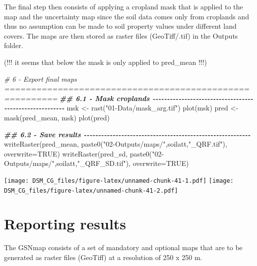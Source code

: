 \documentclass[
  10pt,
  b5paper,
  oneside]{book}
\newenvironment{Shaded}{\begin{snugshade}}{\end{snugshade}}
\newcommand{\AttributeTok}[1]{\textcolor[rgb]{0.77,0.63,0.00}{#1}}
\newcommand{\CommentTok}[1]{\textcolor[rgb]{0.56,0.35,0.01}{\textit{#1}}}
\newcommand{\ConstantTok}[1]{\textcolor[rgb]{0.00,0.00,0.00}{#1}}
\newcommand{\DocumentationTok}[1]{\textcolor[rgb]{0.56,0.35,0.01}{\textbf{\textit{#1}}}}
\newcommand{\FunctionTok}[1]{\textcolor[rgb]{0.00,0.00,0.00}{#1}}
\newcommand{\NormalTok}[1]{#1}
\newcommand{\OtherTok}[1]{\textcolor[rgb]{0.56,0.35,0.01}{#1}}
\newcommand{\StringTok}[1]{\textcolor[rgb]{0.31,0.60,0.02}{#1}}
\begin{document}
The final step then consists of applying a cropland mask that is applied to the map and the uncertainty map since the soil data comes only from croplands and thus no assumption can be made to soil property values under different land covers. The maps are then stored as raster files (GeoTiff/.tif) in the Outputs folder.

(!!! it seems that below the mask is only applied to pred\_mean !!!)

\begin{Shaded}
\begin{Highlighting}[]
\CommentTok{\# 6 {-} Export final maps ========================================================}
\DocumentationTok{\#\# 6.1 {-} Mask croplands {-}{-}{-}{-}{-}{-}{-}{-}{-}{-}{-}{-}{-}{-}{-}{-}{-}{-}{-}{-}{-}{-}{-}{-}{-}{-}{-}{-}{-}{-}{-}{-}{-}{-}{-}{-}{-}{-}{-}{-}{-}{-}{-}{-}{-}{-}{-}{-}{-}{-}{-}{-}{-}{-}{-}{-}}
\NormalTok{msk }\OtherTok{\textless{}{-}} \FunctionTok{rast}\NormalTok{(}\StringTok{"01{-}Data/mask\_arg.tif"}\NormalTok{)}
\FunctionTok{plot}\NormalTok{(msk)}
\NormalTok{pred }\OtherTok{\textless{}{-}} \FunctionTok{mask}\NormalTok{(pred\_mean, msk)}
\FunctionTok{plot}\NormalTok{(pred)}

\DocumentationTok{\#\# 6.2 {-} Save results {-}{-}{-}{-}{-}{-}{-}{-}{-}{-}{-}{-}{-}{-}{-}{-}{-}{-}{-}{-}{-}{-}{-}{-}{-}{-}{-}{-}{-}{-}{-}{-}{-}{-}{-}{-}{-}{-}{-}{-}{-}{-}{-}{-}{-}{-}{-}{-}{-}{-}{-}{-}{-}{-}{-}{-}{-}{-}}
\FunctionTok{writeRaster}\NormalTok{(pred\_mean, }
            \FunctionTok{paste0}\NormalTok{(}\StringTok{"02{-}Outputs/maps/"}\NormalTok{,soilatt,}\StringTok{"\_QRF.tif"}\NormalTok{),}
            \AttributeTok{overwrite=}\ConstantTok{TRUE}\NormalTok{)}
\FunctionTok{writeRaster}\NormalTok{(pred\_sd, }
            \FunctionTok{paste0}\NormalTok{(}\StringTok{"02{-}Outputs/maps/"}\NormalTok{,soilatt,}\StringTok{"\_QRF\_SD.tif"}\NormalTok{),}
            \AttributeTok{overwrite=}\ConstantTok{TRUE}\NormalTok{)}
\end{Highlighting}
\end{Shaded}

\texttt{[image: DSM\_CG\_files/figure-latex/unnamed-chunk-41-1.pdf]} \texttt{[image: DSM\_CG\_files/figure-latex/unnamed-chunk-41-2.pdf]}

\hypertarget{reporting-results}{%
\chapter{Reporting results}\label{reporting-results}}

The GSNmap consists of a set of mandatory and optional maps that are to be generated as raster files (GeoTiff) at a resolution of 250 x 250 m.
\end{document}
